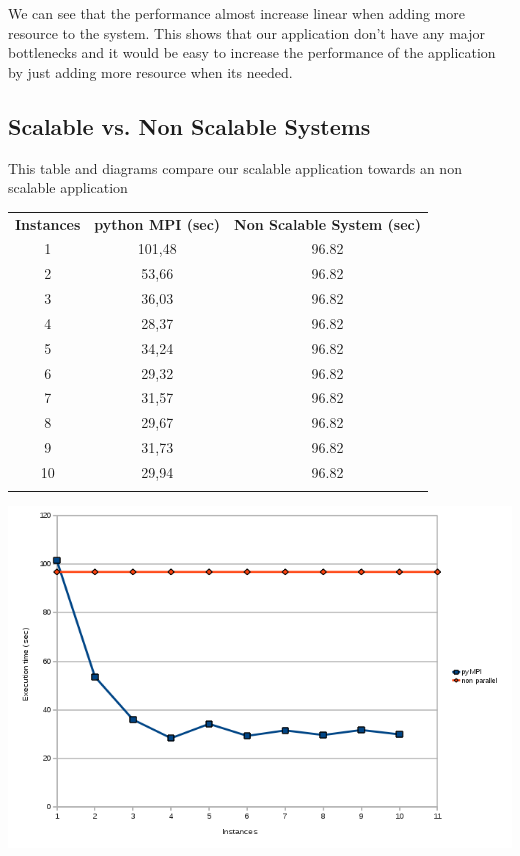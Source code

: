 \documentclass{article}
\begin{document}
We can see that the performance almost increase linear when adding more
resource to the system. This shows that our application don't have any
major bottlenecks and it would be easy to increase the performance
of the application by just adding more resource when its needed.

\subsection{Scalable vs. Non Scalable Systems}
This table and diagrams compare our scalable application towards an non
scalable application

\begin{tabular}{c c c}
  \rowcolor[gray]{0.5}
  {\bf Instances} & {\bf python MPI (sec)} & {\bf Non Scalable System (sec)} \\
  1 & 101,48 & 96.82 \\
  2 & 53,66  & 96.82  \\
  3 & 36,03  & 96.82  \\
  4 & 28,37  & 96.82  \\
  5 & 34,24  & 96.82  \\
  6 & 29,32  & 96.82  \\
  7 & 31,57  & 96.82  \\
  8 & 29,67  & 96.82  \\
  9 & 31,73  & 96.82  \\
 10 & 29,94  & 96.82  \\
\rowcolor[gray]{0.5}
\end{tabular}
\newline
\includegraphics[width=\textwidth]{img/parallel-vs-non-parallel.png}
\end{document}
